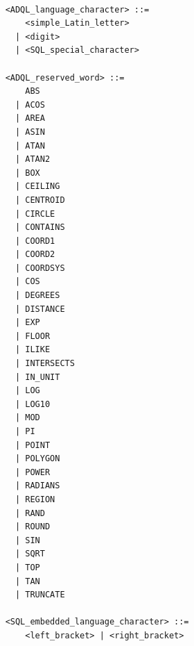 \documentclass[11pt,a4paper]{ivoa}
\begin{document}
\begin{verbatim}

    <ADQL_language_character> ::=
        <simple_Latin_letter>
      | <digit>
      | <SQL_special_character>

    <ADQL_reserved_word> ::=
        ABS
      | ACOS
      | AREA
      | ASIN
      | ATAN
      | ATAN2
      | BOX
      | CEILING
      | CENTROID
      | CIRCLE
      | CONTAINS
      | COORD1
      | COORD2
      | COORDSYS
      | COS
      | DEGREES
      | DISTANCE
      | EXP
      | FLOOR
      | ILIKE
      | INTERSECTS
      | IN_UNIT
      | LOG
      | LOG10
      | MOD
      | PI
      | POINT
      | POLYGON
      | POWER
      | RADIANS
      | REGION
      | RAND
      | ROUND
      | SIN
      | SQRT
      | TOP
      | TAN
      | TRUNCATE

    <SQL_embedded_language_character> ::=
        <left_bracket> | <right_bracket>


\end{verbatim}
\end{document}
